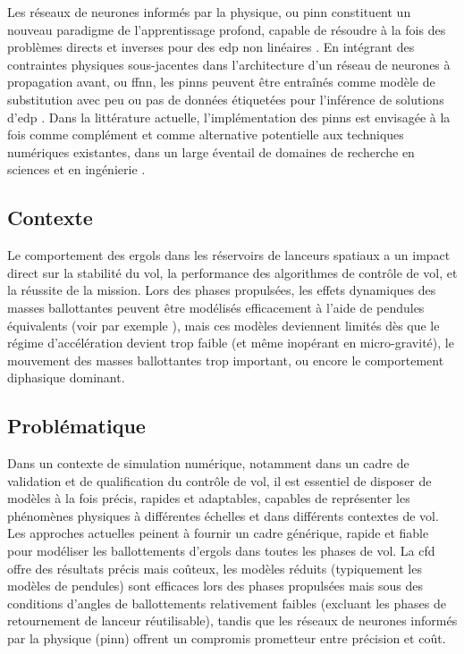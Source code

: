 \documentclass[12pt]{article}
\begin{document}
	Les réseaux de neurones informés par la physique, ou \gls{pinn} constituent un nouveau paradigme de l’apprentissage profond, capable de résoudre à la fois des problèmes directs et inverses pour des \gls{edp} non linéaires \cite{raissiPhysicsinformedNeuralNetworks2019}. En intégrant des contraintes physiques sous-jacentes dans l’architecture d’un réseau de neurones à propagation avant, ou \gls{ffnn}, les \gls{pinn}s peuvent être entraînés comme modèle de substitution avec peu ou pas de données étiquetées pour l’inférence de solutions d’\gls{edp} \cite{cuomoScientificMachineLearning2022}. Dans la littérature actuelle, l’implémentation des \gls{pinn}s est envisagée à la fois comme complément et comme alternative potentielle aux techniques numériques existantes, dans un large éventail de domaines de recherche en sciences et en ingénierie \cite{maoPhysicsinformedNeuralNetworks2020,buosoPersonalisingLeftventricularBiophysical2021, caiPhysicsInformedNeuralNetworks2021}.
	
	\subsection*{Contexte}
	
	
	Le comportement des ergols dans les réservoirs de lanceurs spatiaux a un impact direct sur la stabilité du vol, la performance des algorithmes de contrôle de vol, et la réussite de la mission. Lors des phases propulsées, les effets dynamiques des masses ballottantes peuvent être modélisés efficacement à l'aide de pendules équivalents (voir par exemple \cite{ibrahimLiquidSloshingDynamics2005a}), mais ces modèles deviennent limités dès que le régime d’accélération devient trop faible (et même inopérant en micro-gravité), le mouvement des masses ballottantes trop important, ou encore le comportement diphasique dominant.
	
	\subsection*{Problématique}
	
	Dans un contexte de simulation numérique, notamment dans un cadre de validation et de qualification du contrôle de vol, il est essentiel de disposer de modèles à la fois précis, rapides et adaptables, capables de représenter les phénomènes physiques à différentes échelles et dans différents contextes de vol.
	Les approches actuelles peinent à fournir un cadre générique, rapide et fiable pour modéliser les ballottements d’ergols dans toutes les phases de vol. La \acrshort{cfd} offre des résultats précis mais coûteux, les modèles réduits (typiquement les modèles de pendules) sont efficaces lors des phases propulsées mais sous des conditions d'angles de ballottements relativement faibles (excluant les phases de retournement de lanceur réutilisable), tandis que les réseaux de neurones informés par la physique (\gls{pinn}) offrent un compromis prometteur entre précision et coût.
	
\end{document}
